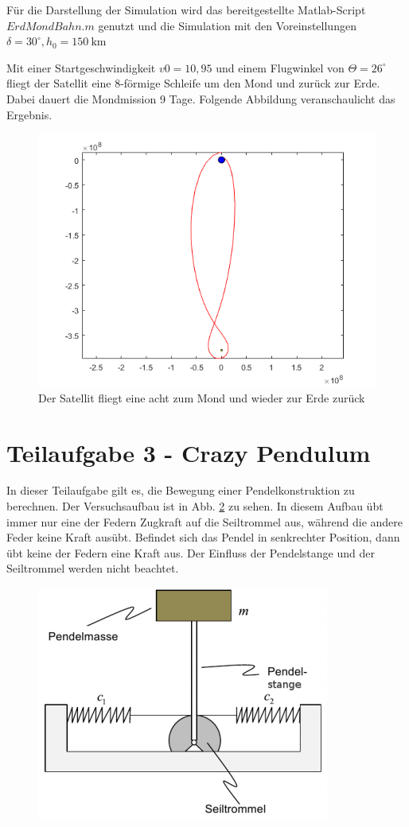 \documentclass[]{scrartcl}
\begin{document}
Für die Darstellung der Simulation wird das bereitgestellte Matlab-Script $ErdMondBahn.m$ genutzt und die Simulation mit den Voreinstellungen 
 $\delta = 30^\circ, h_0 = \SI{150}{\km}$
 
Mit einer Startgeschwindigkeit $v0 = 10,95$ und einem Flugwinkel von $\Theta = 26^\circ $ fliegt der Satellit eine 8-förmige Schleife um den Mond und zurück zur Erde. Dabei dauert die Mondmission 9 Tage. Folgende Abbildung veranschaulicht das Ergebnis.

\begin{figure}[H]
\centering
\includegraphics[width=1\linewidth]{./2_MondErdeAcht}
\caption{Der Satellit fliegt eine acht zum Mond und wieder zur Erde zurück}
\label{fig:2_MondErdeAcht}
\end{figure}

\section{Teilaufgabe 3 - Crazy Pendulum}
In dieser Teilaufgabe gilt es, die Bewegung einer Pendelkonstruktion zu berechnen. Der Versuchsaufbau ist in Abb. \ref{fig:3_Versuchsaufbau} zu sehen. In diesem Aufbau übt immer nur eine der Federn Zugkraft auf die Seiltrommel aus, während die andere Feder keine Kraft ausübt. Befindet sich das Pendel in senkrechter Position, dann übt keine der Federn eine Kraft aus. Der Einfluss der Pendelstange und der Seiltrommel werden nicht beachtet.

\begin{figure}[H]
\centering
\includegraphics[width=0.5\linewidth]{./3_Versuchsaufbau}
\caption{}
\label{fig:3_Versuchsaufbau}
\end{figure}
\end{document}
